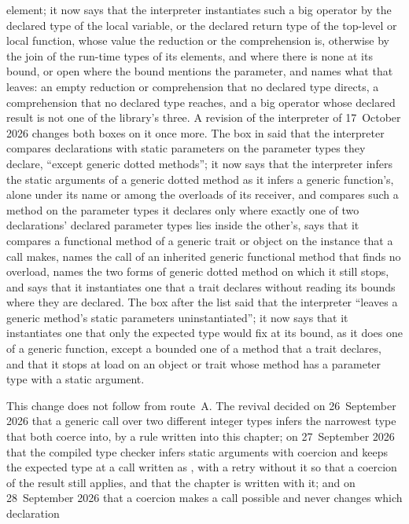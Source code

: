 \begin{description}
element; it now says that the interpreter instantiates such a big operator by
the declared type of the local variable, or the declared return type of the
top-level or local function, whose value the reduction or the comprehension is,
otherwise by the join of the run-time types of its
elements, and where there is none at its bound, or open where the bound
mentions the parameter, and names what that leaves: an empty reduction or
comprehension that no declared type directs, a comprehension that no declared
type reaches, and a big operator whose declared result is not one of the
library's three.
A revision of the interpreter of 17~October 2026 changes both boxes on it once
more.
The box in  said that the interpreter compares
declarations with static parameters on the parameter types they declare,
``except generic dotted methods''; it now says that the interpreter infers the
static arguments of a generic dotted method as it infers a generic function's,
alone under its name or among the overloads of its receiver, and compares such
a method on the parameter types it declares only where exactly one of two
declarations' declared parameter types lies inside the other's, says that it
compares a functional method of a generic trait or object on the instance that
a call makes, names the call of an inherited generic functional method that
finds no overload, names the two forms of generic
dotted method on which it still stops, and says that it instantiates one that a
trait declares without reading its bounds where they are declared.
The box after the list said that the interpreter ``leaves a generic method's
static parameters uninstantiated''; it now says that it instantiates one that
only the expected type would fix at its bound, as it does one of a generic
function, except a bounded one of a method that a trait declares, and that it
stops at load on an object or trait whose method has a parameter type with a
 static argument.
\item[Rationale] This change does not follow from route~A.
The revival decided on 26~September 2026 that a generic call over two different
integer types infers the narrowest type that both coerce into, by a rule
written into this chapter; on 27~September 2026 that the compiled type checker
infers static arguments with coercion and keeps the expected type at a call
written as , with a retry without it so that a coercion of the result
still applies, and that the chapter is written with it; and on 28~September
2026 that a coercion makes a call possible and never changes which declaration

\end{description}
